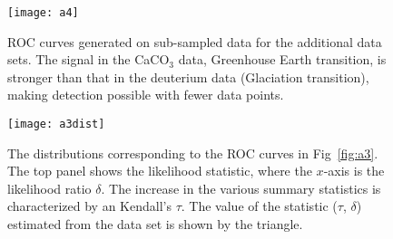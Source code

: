 \documentclass[authoryear, preprint,review,12pt]{elsarticle}
\begin{document}
\begin{figure}[ht]
  \begin{center}
    \texttt{[image: a4]}
  \end{center}
  \caption{ROC curves generated on sub-sampled data for the additional data sets.  The signal in the CaCO$_3$ data, Greenhouse Earth transition, is stronger than that in the deuterium data (Glaciation transition), making detection possible with fewer data points.}
  \label{fig:a4}
\end{figure}


\begin{figure}[ht]
  \begin{center}
    \texttt{[image: a3dist]}
  \end{center}
  \caption{The distributions corresponding to the ROC curves in Fig~\ref{fig:a3}. The top panel shows the likelihood statistic, where the $x$-axis is the likelihood ratio $\delta$.  The increase in the various summary statistics is characterized by an Kendall's $\tau$.  The value of the statistic ($\tau$, $\delta$) estimated from the data set is shown by the triangle.   }
  \label{fig:a3dist}
\end{figure}


\section*{ }%

\end{document}
